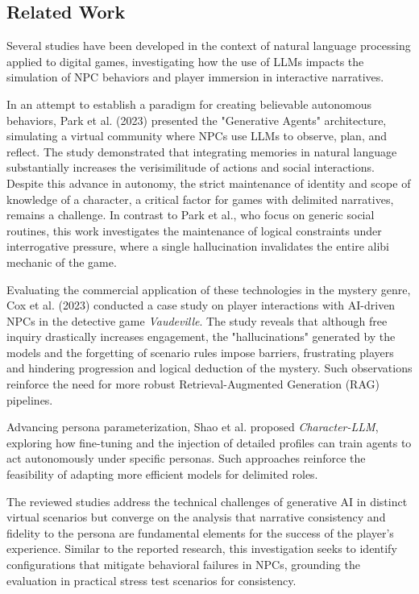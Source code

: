 \documentclass[12pt]{article}
\begin{document}
\subsection{Related Work}

Several studies have been developed in the context of natural language processing applied to digital games, investigating how the use of LLMs impacts the simulation of NPC behaviors and player immersion in interactive narratives.

In an attempt to establish a paradigm for creating believable autonomous behaviors, Park et al. (2023) presented the "Generative Agents" architecture, simulating a virtual community where NPCs use LLMs to observe, plan, and reflect. The study demonstrated that integrating memories in natural language substantially increases the verisimilitude of actions and social interactions. Despite this advance in autonomy, the strict maintenance of identity and scope of knowledge of a character, a critical factor for games with delimited narratives, remains a challenge. In contrast to Park et al., who focus on generic social routines, this work investigates the maintenance of logical constraints under interrogative pressure, where a single hallucination invalidates the entire alibi mechanic of the game.

Evaluating the commercial application of these technologies in the mystery genre, Cox et al. (2023) conducted a case study on player interactions with AI-driven NPCs in the detective game \textit{Vaudeville}. The study reveals that although free inquiry drastically increases engagement, the "hallucinations" generated by the models and the forgetting of scenario rules impose barriers, frustrating players and hindering progression and logical deduction of the mystery. Such observations reinforce the need for more robust Retrieval-Augmented Generation (RAG) pipelines.

Advancing persona parameterization, Shao et al. \cite{shao2023character} proposed \textit{Character-LLM}, exploring how fine-tuning and the injection of detailed profiles can train agents to act autonomously under specific personas. Such approaches reinforce the feasibility of adapting more efficient models for delimited roles.

The reviewed studies address the technical challenges of generative AI in distinct virtual scenarios but converge on the analysis that narrative consistency and fidelity to the persona are fundamental elements for the success of the player's experience. Similar to the reported research, this investigation seeks to identify configurations that mitigate behavioral failures in NPCs, grounding the evaluation in practical stress test scenarios for consistency.
\end{document}

